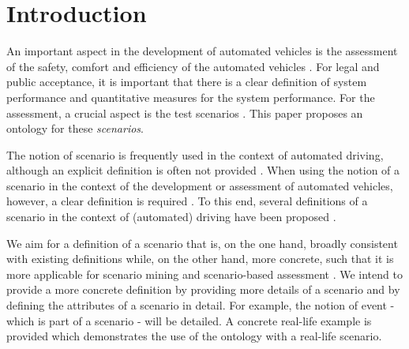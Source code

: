 \section{Introduction}
\label{sec:introduction}

An important aspect in the development of automated vehicles is the assessment of the safety, comfort and efficiency of the automated vehicles \cite{bengler2014threedecades, stellet2015taxonomy, Helmer2017safety, putz2017pegasus, roesener2017comprehensive, gietelink2006development}. For legal and public acceptance, it is important that there is a clear definition of system performance and quantitative measures for the system performance. For the assessment, a crucial aspect is the test scenarios \cite{stellet2015taxonomy}. This paper proposes an ontology for these \emph{scenarios}.

The notion of scenario is frequently used in the context of automated driving, although an explicit definition is often not provided \cite{putz2017pegasus, roesener2017comprehensive, gietelink2006development, hulshof2013autonomous, karaduman2013interactivebehavior, englund2016grand, xu2002effects, ebner2011identifying, ploeg2017GCDC, zofka2015datadrivetrafficscenarios}. When using the notion of a scenario in the context of the development or assessment of automated vehicles, however, a clear definition is required \cite{stellet2015taxonomy, Helmer2017safety, alvarez2017prospective, zofka2015datadrivetrafficscenarios, aparicio2013pre, lesemann2011test, putz2017pegasus, geyer2014, ulbrich2015}. To this end, several definitions of a scenario in the context of (automated) driving have been proposed \cite{geyer2014, ulbrich2015, elrofai2016scenario}.

We aim for a definition of a scenario that is, on the one hand, broadly consistent with existing definitions \cite{geyer2014, ulbrich2015, elrofai2016scenario} while, on the other hand, more concrete, such that it is more applicable for scenario mining \cite{elrofai2016scenario} and scenario-based assessment \cite{stellet2015taxonomy, deGelder2017assessment}. We intend to provide a more concrete definition by providing more details of a scenario and by defining the attributes of a scenario in detail. For example, the notion of event - which is part of a scenario - will be detailed. A concrete real-life example is provided which demonstrates the use of the ontology with a real-life scenario.

